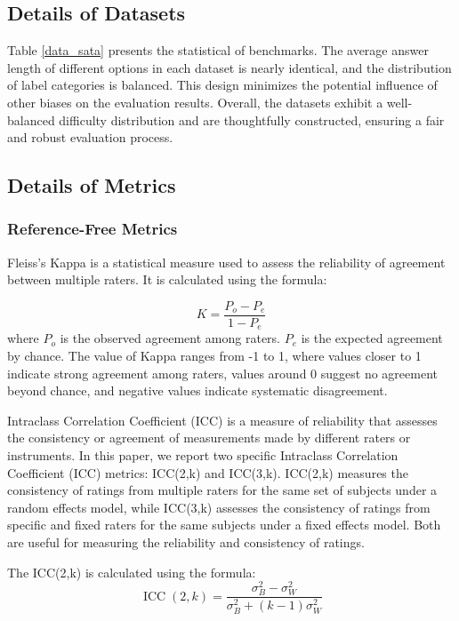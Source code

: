 \documentclass[sigconf]{acmart}
\begin{document}
\subsection{Details of Datasets}
\label{data_detail}
Table \ref{data_sata} presents the statistical of benchmarks. The average answer length of different options in each dataset is nearly identical, and the distribution of label categories is balanced. This design minimizes the potential influence of other biases on the evaluation results. Overall, the datasets exhibit a well-balanced difficulty distribution and are thoughtfully constructed, ensuring a fair and robust evaluation process.

\subsection{Details of Metrics}
\label{metric_detail}

\subsubsection{Reference-Free Metrics}

Fleiss's Kappa is a statistical measure used to assess the reliability of agreement between multiple raters. It is calculated using the formula:

\begin{equation} \label{eq:partial_1}
K=\frac{P_{o}-P_{e}}{1-P_{e}}
\end{equation}
where $P_o$ is the observed agreement among raters. $P_e$ is the expected agreement by chance. The value of Kappa ranges from -1 to 1, where values closer to 1 indicate strong agreement among raters, values around 0 suggest no agreement beyond chance, and negative values indicate systematic disagreement.

Intraclass Correlation Coefficient (ICC) is a measure of reliability that assesses the consistency or agreement of measurements made by different raters or instruments. In this paper, we report two specific Intraclass Correlation Coefficient (ICC) metrics: ICC(2,k) and ICC(3,k). ICC(2,k) measures the consistency of ratings from multiple raters for the same set of subjects under a random effects model, while ICC(3,k) assesses the consistency of ratings from specific and fixed raters for the same subjects under a fixed effects model. Both are useful for measuring the reliability and consistency of ratings.

The ICC(2,k) is calculated using the formula:
\begin{equation} \label{eq:partial_2}
\operatorname{ICC}(2, k)=\frac{\sigma_{B}^{2}-\sigma_{W}^{2}}{\sigma_{B}^{2}+(k-1) \sigma_{W}^{2}}
\end{equation}
\end{document}
